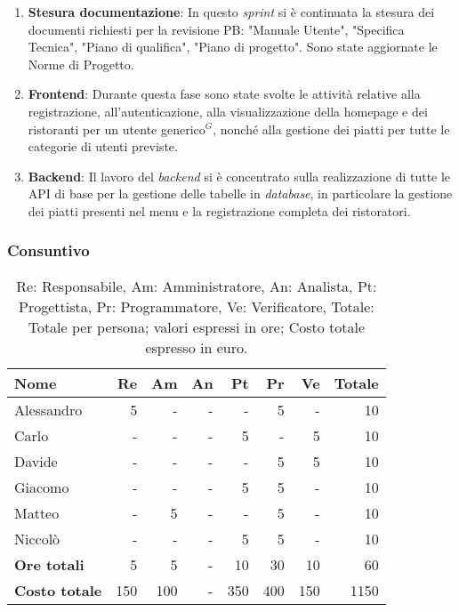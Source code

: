 \begin{enumerate}
	\item \textbf{Stesura documentazione}: In questo \textit{sprint} si è continuata la stesura dei documenti richiesti per la revisione PB: "Manuale Utente", "Specifica Tecnica", "Piano di qualifica", "Piano di progetto". Sono state aggiornate le Norme di Progetto.

	\item \textbf{Frontend}: Durante questa fase sono state svolte le attività relative alla registrazione, all'autenticazione, alla visualizzazione della homepage e dei ristoranti per un utente generico$^G$, nonché alla gestione dei piatti per tutte le categorie di utenti previste.

	\item \textbf{Backend}: Il lavoro del \textit{backend} si è concentrato sulla realizzazione di tutte le API di base per la gestione delle tabelle in \textit{database}, in particolare la gestione dei piatti presenti nel menu e la registrazione completa dei ristoratori.
\end{enumerate}

\subsubsection{Consuntivo}
\begin{table}[H]
	\centering
	\begin{tabular}{l|r|r|r|r|r|r|r}
		\textbf{Nome}         & \textbf{Re} & \textbf{Am} & \textbf{An} & \textbf{Pt} & \textbf{Pr} & \textbf{Ve} & \textbf{Totale} \\
		\hline
		Alessandro            & 5           & -           & -           & -           & 5           & -           & 10              \\
		Carlo                 & -           & -           & -           & 5           & -           & 5           & 10              \\
		Davide                & -           & -           & -           & -           & 5           & 5           & 10              \\
		Giacomo               & -           & -           & -           & 5           & 5          	& -           & 10              \\
		Matteo                & -           & 5           & -           & -           & 5           & -           & 10              \\
		Niccolò               & -           & -           & -           & 5           & 5           & -           & 10              \\
		\hline
		\textbf{Ore totali}   & 5           & 5           & -           & 10          & 30          & 10          & 60              \\
		\textbf{Costo totale} & 150         & 100         & -           & 350         & 400         & 150         & 1150
	\end{tabular}
	\caption{Re: Responsabile, Am: Amministratore, An: Analista, Pt: Progettista,
		Pr: Programmatore, Ve: Verificatore, Totale: Totale per persona; valori espressi in ore; Costo totale espresso in euro.}
\end{table}

